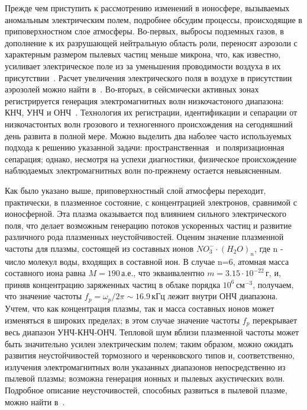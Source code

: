 \documentclass[12pt, oneside, a4paper]{article}
\begin{document}
Прежде чем приступить к рассмотрению изменений в ионосфере, вызываемых аномальным электрическим полем,  подробнее обсудим  процессы, происходящие в приповерхностном слое атмосферы. Во-первых, выбросы подземных газов, в дополнение к их разрушающей нейтральную область роли, переносят аэрозоли с характерным размером пылевых частиц меньше микрона, что, как известно, усиливает электрическое поле из за уменьшения проводимости воздуха в их присутствии~\cite{Krider_Roble:1986}. Расчет увеличения электрического поля в воздухе в присутствии аэрозолей можно найти в~\cite{Pulinets:2000}. Во-вторых, в сейсмически активных зонах регистрируется генерация электромагнитных волн низкочастоного диапазона: КНЧ, УНЧ и ОНЧ~\cite{Nagao:2002}.  Технология их регистрации, идентификации и сепарации от низкочастонтых волн грозового и техногенного происхождения на сегодняшний день развита в полной мере. Можно выделить два наболее часто используемых подхода к решению указанной задачи: пространственная~\cite{Ismaguilov:2001} и поляризационная~\cite{Hattori:2002} сепарация; однако, несмотря на успехи диагностики, физическое происхождение наблюдаемых электромагнитных волн по-прежнему остается невыясненным. 

Как было указано выше, приповерхностный слой атмосферы переходит, практически, в плазменное состояние, с концентрацией электронов, сравнимой с ионосферной.  Эта плазма оказывается под влиянием сильного электрического поля, что делает возможным генерацию потоков ускоренных частиц и развитие различного рода плазменных неустойчивостей. Оценим значение плазменной частоты для плазмы, состоящей из составных ионов $NO^-_3\cdot{}(H_2O)_n$, где n - число молекул воды, входящих в составной ион. В случае n=6, атомная масса составного иона равна $M=190$\,а.е., что экваивалентно $m=3.15\cdot{}10^{-22}$\,г, и, приняв концентрацию заряженных частиц в облаке порядка $10^6$\,см$^{-3}$, получаем, что значение частоты $f_p=\omega_p/2\pi\sim{}16.9$\,кГц лежит внутри ОНЧ диапазона. Учтем, что как концентрация плазмы, так и масса составных ионов может изменяться в широких пределах; в этом случае значение частоты $f_p$ перекрывает весь диапазон УНЧ-КНЧ-ОНЧ. Тепловой шум вблизи плазменной частоты может быть значительно усилен электрическим полем; таким образом, можно ожидать развития неустойчивостей тормозного и черенковского типов и, соответственно, излучения электромагнитных волн указанных диапазонов непосредственно из пылевой плазмы; возможна генерация ионных и пылевых акустических волн. Подробное описание неусточивостей, способных развиться в пылевой плазме, можно найти в~\cite{Kikuchi:2001}. 
\end{document}
